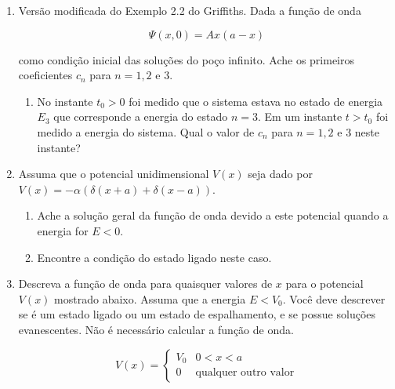\documentclass[a4paper, 12pt, notitlepage]{article}
\begin{document}
\begin{enumerate}
\item Versão modificada do Exemplo 2.2 do Griffiths. Dada a função de onda

  \begin{equation*}
  \Psi(x, 0) = Ax(a-x)
  \end{equation*}
  
  \noindent como condição inicial das soluções do poço infinito. Ache os primeiros coeficientes $c_n$ para $n = 1, 2$ e $3$.
  
  \begin{enumerate}
    \item No instante $t_0 > 0$ foi medido que o sistema estava no estado de energia $E_3$ que corresponde a energia do estado $n = 3$. Em um instante $t > t_0$ foi medido a energia do sistema. Qual o valor de $c_n$ para $n = 1, 2$ e $3$ neste instante?
  \end{enumerate}

\item Assuma que o potencial unidimensional $V(x)$ seja dado por $V(x) = -\alpha\left(\delta(x+a) + \delta(x-a)\right)$. 

  \begin{enumerate}  
  \item Ache a solução geral da função de onda devido a este potencial quando a energia for $E < 0$.
  \item Encontre a condição do estado ligado neste caso.
  \end{enumerate}

\item Descreva a função de onda para quaisquer valores de $x$ para o potencial $V(x)$ mostrado abaixo. Assuma que a energia $E < V_0$. Você deve descrever se é um estado ligado ou um estado de espalhamento, e se possue soluções evanescentes. Não é necessário calcular a função de onda.

  \begin{equation*}
    V(x) = \begin{cases} V_0 & 0 < x < a\\ 0 & \text{qualquer outro valor} \end{cases}
  \end{equation*}

\end{enumerate}
\end{document}
